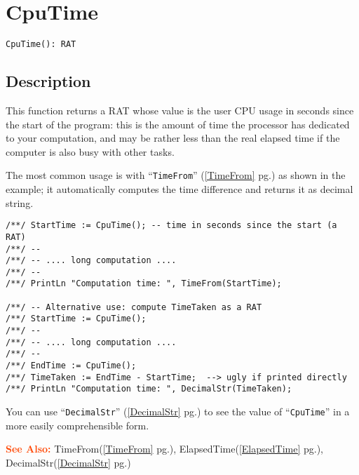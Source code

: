 \documentclass[a4paper]{mybook}
\newenvironment{command}{}{} %
\newcommand\SeeAlso{\par\textcolor{OrangeRed}{\textbf{\large See Also: }}}
\begin{document}
\section{CpuTime}
\label{CpuTime}
\begin{command} %


\begin{Verbatim}[label=syntax, rulecolor=\color{MidnightBlue},
frame=single]
CpuTime(): RAT
\end{Verbatim}


\subsection*{Description}

This function returns a RAT whose value is the user CPU usage in
seconds since the start of the program: this is the amount of time the
processor has dedicated to your computation, and may be rather less than
the real elapsed time if the computer is also busy with other tasks.
\par 
The most common usage is with ``\verb&TimeFrom&'' (\ref{TimeFrom} pg.\pageref{TimeFrom}) as shown in the example;
it automatically computes the time difference and returns it as decimal
string.
\begin{Verbatim}[label=example, rulecolor=\color{PineGreen}, frame=single]
/**/ StartTime := CpuTime(); -- time in seconds since the start (a RAT)
/**/ --
/**/ -- .... long computation ....
/**/ --
/**/ PrintLn "Computation time: ", TimeFrom(StartTime);

/**/ -- Alternative use: compute TimeTaken as a RAT
/**/ StartTime := CpuTime();
/**/ --
/**/ -- .... long computation ....
/**/ --
/**/ EndTime := CpuTime();
/**/ TimeTaken := EndTime - StartTime;  --> ugly if printed directly
/**/ PrintLn "Computation time: ", DecimalStr(TimeTaken);
\end{Verbatim}

You can use ``\verb&DecimalStr&'' (\ref{DecimalStr} pg.\pageref{DecimalStr}) to see the value of ``\verb&CpuTime&'' in a more easily
comprehensible form.

\SeeAlso %
  TimeFrom(\ref{TimeFrom} pg.\pageref{TimeFrom}), 
    ElapsedTime(\ref{ElapsedTime} pg.\pageref{ElapsedTime}), 
    DecimalStr(\ref{DecimalStr} pg.\pageref{DecimalStr})
\end{command} %
\end{document}
